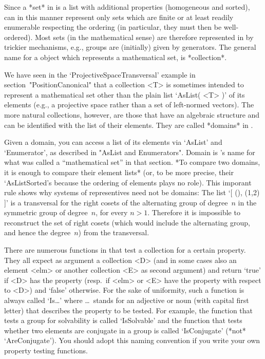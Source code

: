 
Since a *set* in {\GAP} is a list with additional properties (homogeneous
and sorted),  {\GAP} can in  this manner  represent only sets  which  are
finite   or at least   readily  enumerable  respecting the ordering   (in
particular, they  must   then  be  well-ordered).  Most   sets  (in   the
mathematical sense) are   therefore represented  in {\GAP}   by  trickier
mechanisms, e.g., groups are (initially) given by generators. The general
name  for a   {\GAP}  object  which   represents a mathematical   set, is
*collection*.

\null

We   have  seen    in  the   `ProjectiveSpaceTransversal'   example    in
section~"PositionCanonical" that a  collection <T> is  sometimes intended
to represent a mathematical set other than the plain list `AsList( <T> )'
of  its    elements (e.g., a  projective   space  rather than a    set of
left-normed vectors).  The more natural  collections,  however, are those
that have an  algebraic structure and can  be identified with the list of
their elements. They are called *domains* in {\GAP}.

Given  a domain, you can access  a list of its  elements via `AsList' and
`Enumerator',   as described  in   "AsList  and Enumerators". Domain   is
{\GAP}'s name for what was called a ``mathematical set'' in that section.
*To compare  two domains, it  is enough to   compare their element lists*
(or, to  be more precise, their  `AsListSorted's  because the ordering of
elements   plays no  role).  This  imporant rule   shows  why systems  of
representives need not   be domains:  The  list `[   (),  (1,2) ]'   is a
transversal for the  right cosets of the  alternating group of degree~$n$
in the symmetric  group of degree~$n$, for every  $n>1$. Therefore it  is
impossible to  reconstruct the set of right  cosets  (which would include
the alternating group, and hence the degree~$n$) from the transversal.


There are  numerous functions  in  {\GAP}  that test  a collection  for a
certain property. They  all expect as argument  a collection <D>  (and in
some cases also   an element <elm>  or  another collection <E> as  second
argument)  and return `true'  if <D> has the  property (resp.~if <elm> or
<E> have the property with respect to <D>) and `false' otherwise. For the
sake of uniformity,  such  a function is  always called   `Is\dots' where
\dots\ stands  for an adjective or  noun (with capital first letter) that
describes the property to be tested. For example, the function that tests
a group for   solvability is called   `IsSolvable' and the function  that
tests whether    two elements  are  conjugate   in  a  group   is  called
`IsConjugate'  (*not*  `AreConjugate').  You  should adopt   this  naming
convention if you write your own property testing functions.

